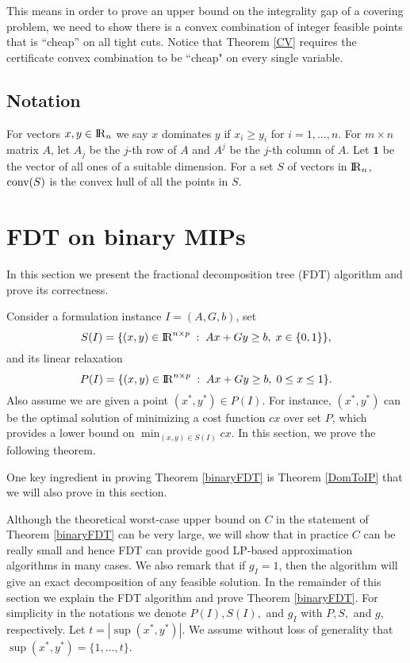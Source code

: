 \documentclass[runningheads]{llncs}
\begin{document}
This means in order to prove an upper bound on the integrality gap of a covering problem, we need to show there is a convex combination of integer feasible points that is ``cheap'' on all tight cuts. Notice that Theorem \ref{CV} requires the certificate convex combination to be ``cheap" on every single variable.


\subsection{Notation}
For vectors $x,y\in {\rm I\!R}_{n}$ we say $x$ dominates $y$ if $x_i\geq y_i$ for $i= 1,\ldots,n$. For $m\times n$ matrix $A$, let $A_j$ be the $j$-th row of $A$ and $A^j$ be the $j$-th column of $A$. Let $\textbf{1}$ be the vector of all ones of a suitable dimension. For a set $S$ of vectors in ${\rm I\!R}_{n}$, $\operatorname{conv}(S)$ is the convex hull of all the points in $S$.


\section{FDT on binary MIPs}
\label{binaryfdt}

In this section we present the fractional decomposition tree (FDT) algorithm and prove its correctness. 

Consider a formulation instance $I=(A,G,b)$, set 
\begin{equation}
S(I)= \{(x,y)\in {\rm I\!R}^{n\times p}\;:\; Ax+Gy\geq b,\; x\in \{0,1\}\},  \label{S'}
\end{equation}
and its linear relaxation
\begin{equation}
P(I) = \{(x,y)\in {\rm I\!R}^{n\times p}\;:\; Ax+Gy\geq b,\; 0 \leq x\leq 1\}. \label{P'}
\end{equation}
Also assume we are given a point $(x^*,y^*)\in P(I)$. For instance, $(x^*,y^*)$ can be the optimal solution of minimizing a cost function $cx$ over set $P$, which provides a lower bound on $\min_{(x,y)\in S(I)} cx$. In this section, we prove the following theorem.  

\binaryFDT*

One key ingredient in proving Theorem \ref{binaryFDT} is Theorem \ref{DomToIP} that we will also prove in this section.



Although the theoretical worst-case upper bound on $C$ in the statement of Theorem \ref{binaryFDT} can be very large, we will show that in practice $C$ can be really small and hence FDT can provide good LP-based approximation algorithms in many cases. We also remark that if $g_I=1$, then the algorithm will give an exact decomposition of any feasible solution.  In the remainder of this section we explain the FDT algorithm and prove Theorem \ref{binaryFDT}. For simplicity in the notations we denote $P(I),S(I),$ and $g_I$ with $P,S,$ and $g$, respectively. Let $t=|\sup(x^*,y^*)|$. We assume without loss of generality that $\sup(x^*,y^*)= \{1,\ldots,t\}$.
\end{document}

